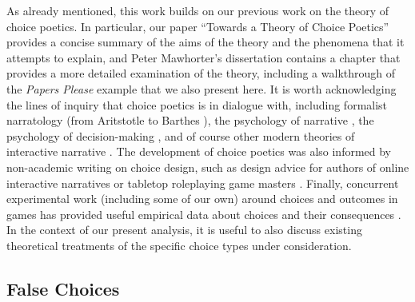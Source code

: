 \documentclass[arts,article,submit,moreauthors,pdftex,10pt,a4paper]{Definitions/mdpi}
\begin{document}
As already mentioned, this work builds on our previous work on the theory of choice poetics.
%
In particular, our paper ``Towards a Theory of Choice Poetics'' \citep{mawhorter2014towards} provides a concise summary of the aims of the theory and the phenomena that it attempts to explain, and Peter Mawhorter's dissertation \citeyear{mawhorter2016artificial} contains a chapter that provides a more detailed examination of the theory, including a walkthrough of the \emph{Papers Please} example that we also present here.
%
It is worth acknowledging the lines of inquiry that choice poetics is in dialogue with, including formalist narratology (from Aritstotle \citeyear{aristotle1917poetics} to Barthes \citeyear{barthes1975introduction}), the psychology of narrative \citep{tversky1981framing,green2000role,mar2008function,zunshine2006why}, the psychology of decision-making \citep{mellers1997decision,schwartz2002maximizing}, and of course other modern theories of interactive narrative \citep{aarseth1997cybertext,murray1997hamlet,ryan1991possible,tosca2000pragmatics,mateas2001preliminary,frasca2003ludologists,lindley2005story}.
%
The development of choice poetics was also informed by non-academic writing on choice design, such as design advice for authors of online interactive narratives \citep{choiceofgames2010rules} or tabletop roleplaying game masters \citep{laws2001robin}.
%
Finally, concurrent experimental work (including some of our own) around choices and outcomes in games has provided useful empirical data about choices and their consequences \citep{fendt2012achieving,cardonarivera2014foreseeing,mawhorter2015generating,iten2018choosing}.
%
In the context of our present analysis, it is useful to also discuss existing theoretical treatments of the specific choice types under consideration.

\subsection{False Choices}
\end{document}
